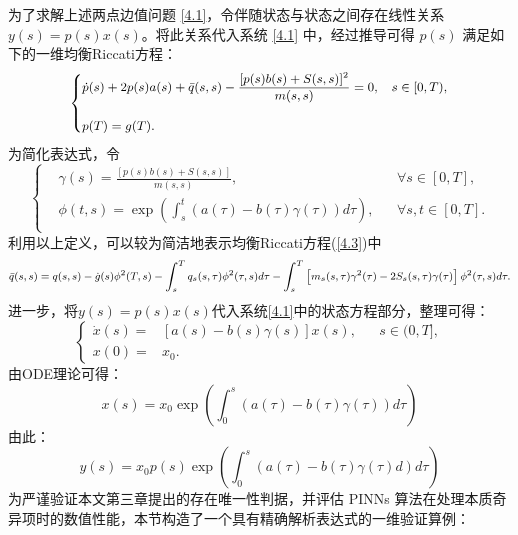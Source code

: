 \documentclass{GZUbachelorthesis}
\begin{document}
为了求解上述两点边值问题 \eqref{4.1}，令伴随状态与状态之间存在线性关系 $y(s) = p(s)x(s)$。将此关系代入系统 \eqref{4.1} 中，经过推导可得 $p(s)$ 满足如下的一维均衡Riccati方程：
\begin{equation}\label{4.3}
	{\small
		\left\{
		\begin{aligned}
			&\dot{p}(s)+2p(s)a(s)+\bar{q}(s,s)-\frac{[p(s)b(s)+S(s,s)]^2}{m(s,s)} = 0, && s\in[0,T),\\[8pt]
			&p(T)=g(T).
		\end{aligned}
		\right.
	}
\end{equation}
为简化表达式，令
\begin{equation}\label{4.4}
	\left\{
	\begin{aligned}
		&\gamma(s)=\frac{[p(s)b(s)+S(s,s)]}{m(s,s)}, &&\forall s\in [0,T],\\[8pt]
		&\phi(t,s)=\exp\left(\int_{s}^{t}\left(a(\tau)-b(\tau)\gamma(\tau)\right)d\tau\right), &&\forall s,t\in [0,T].\\[8pt]
	\end{aligned}
	\right.
\end{equation}
利用以上定义，可以较为简洁地表示均衡Riccati方程(\ref{4.3})中
\begin{equation}\label{4.5}
	{\footnotesize
		\begin{aligned}
			\bar{q}(s,s)=q(s,s)-\dot{g}(s)\phi^2(T,s)-\int_{s}^{T}q_s(s,\tau)\phi^2(\tau,s)d\tau -\int_{s}^{T}\left[m_s(s,\tau)\gamma^2(\tau)-2S_s(s,\tau)\gamma(\tau)\right]\phi^2(\tau,s)d\tau.
	\end{aligned}}
\end{equation} 
进一步，将$y(s) = p(s)x(s)$代入系统\eqref{4.1}中的状态方程部分，整理可得：
\begin{equation}\label{4.13}
	\left\{
	\begin{aligned}
		\dot{x}(s) =&  \left[a(s)-b(s)\gamma(s)\right]x(s) ,&& s\in(0,T], \\[8pt]
		x(0) =& x_0.
	\end{aligned}
	\right.
\end{equation}
由ODE理论可得：
\begin{equation}\label{4.12}
	x(s)=x_0\exp\left(\int_{0}^{s}\left(a(\tau)-b(\tau)\gamma(\tau)\right)d\tau\right)
\end{equation}
由此：
\begin{equation}\label{4.14}
	y(s)=x_0p(s)\exp\left(\int_{0}^{s}\left(a(\tau)-b(\tau)\gamma(\tau)d\right)d\tau\right)
\end{equation}
为严谨验证本文第三章提出的存在唯一性判据，并评估 PINNs 算法在处理本质奇异项时的数值性能，本节构造了一个具有精确解析表达式的一维验证算例：
\end{document}
